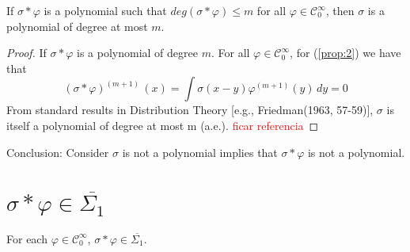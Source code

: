 \documentclass[../main.tex]{subfiles}
\begin{document}
	\begin{lema} %
		If $\sigma \ast \varphi$ is a polynomial such that $ deg (\sigma \ast \varphi) \leq m$ for all $\varphi \in \mathcal{C}^\infty_0$, then $\sigma$ is a polynomial of degree at most $m$. 
	\end{lema}
	\begin{proof} 
	If $\sigma \ast \varphi$ is a polynomial of degree $m$.
	For all $\varphi \in \mathcal{C}^\infty_0$, for (\ref{prop:2}) we have that
	$$(\sigma \ast \varphi)^{(m+1)} \, (x)=\int \sigma(x-y)\varphi^{(m+1)}(y) \, dy= 0$$  
	From standard results in Distribution Theory [e.g., Friedman(1963, 57-59)], $\sigma $ is itself a polynomial of degree at most m (a.e.).  \textcolor{red}{ficar referencia}
	\end{proof} 
\noindent Conclusion: Consider $\sigma$ is not a polynomial implies that $\sigma \ast \varphi$ is not a polynomial. 


\section{$\sigma \ast \varphi \in \overline{\Sigma_1}$}
	\begin{lema} %
		For each $\varphi \in  \mathcal{C}^\infty_0$, $ \sigma \ast \varphi \in  \overline{\Sigma_1}$. 
		
	\end{lema}
	
\end{document}
